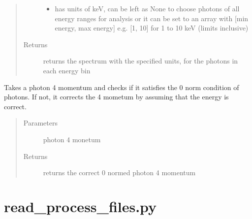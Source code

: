 \documentclass[letterpaper,10pt,english]{sphinxmanual}
\begin{document}
\begin{fulllineitems}
\begin{quote}
\begin{description}
\begin{itemize}
\item {} 
 \textendash{} has units of keV, can be left as None to choose photons of all energy ranges for analysis or it can be set to an array with {[}min energy, max energy{]} e.g. {[}1, 10{]} for 1 to 10 keV (limits inclusive)

\end{itemize}

\item[{Returns}] \leavevmode
returns the spectrum with the specified units, for the photons in each energy bin

\end{description}\end{quote}

\end{fulllineitems}


\begin{fulllineitems}
\label{\detokenize{mclib:mclib.zero_norm}}
Takes a photon 4 momentum and checks if it satisfies the 0 norm condition of photons. If not, it corrects the 4
mometum by assuming that the energy is correct.
\begin{quote}\begin{description}
\item[{Parameters}] \leavevmode
{} \textendash{} photon 4 monetum

\item[{Returns}] \leavevmode
returns the correct 0 normed photon 4 momentum

\end{description}\end{quote}

\end{fulllineitems}



\chapter{read\_process\_files.py}
\label{\detokenize{read_process_files:module-read_process_files}}\label{\detokenize{read_process_files:read-process-files-py}}\label{\detokenize{read_process_files::doc}}
\end{document}
